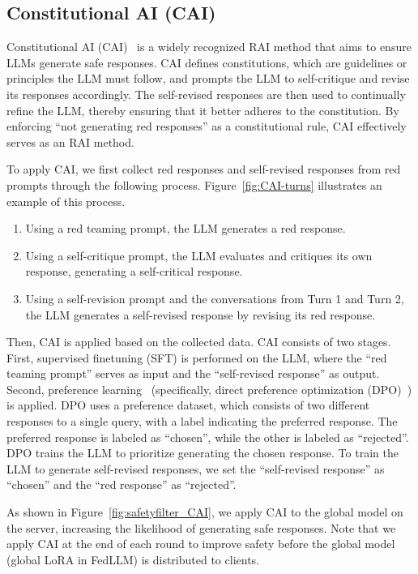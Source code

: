 \subsection{Constitutional AI (CAI)}\label{subsec:CAI}
Constitutional AI (CAI)~\cite{CAI} is a widely recognized RAI method that aims to ensure LLMs generate safe responses.
CAI defines constitutions, which are guidelines or principles the LLM must follow, and prompts the LLM to self-critique and revise its responses accordingly.
The self-revised responses are then used to continually refine the LLM, thereby ensuring that it better adheres to the constitution.
By enforcing ``not generating red responses'' as a constitutional rule, CAI effectively serves as an RAI method.

To apply CAI, we first collect red responses and self-revised responses from red prompts through the following process.
Figure~\ref{fig:CAI-turns} illustrates an example of this process.
\begin{enumerate}[label=(Turn~\arabic*), leftmargin=*]
    \item Using a red teaming prompt, the LLM generates a red response. 
    
    \item Using a self-critique prompt, the LLM evaluates and critiques its own response, generating a self-critical response.

    \item Using a self-revision prompt and the conversations from Turn 1 and Turn 2, the LLM generates a self-revised response by revising its red response.
\end{enumerate}

Then, CAI is applied based on the collected data.
CAI consists of two stages.
First, supervised finetuning (SFT) is performed on the LLM, where the ``red teaming prompt'' serves as input and the ``self-revised response'' as output.
Second, preference learning~\cite{PPO,DPO} (specifically, direct preference optimization (DPO)~\cite{DPO}) is applied.
DPO uses a preference dataset, which consists of two different responses to a single query, with a label indicating the preferred response.
The preferred response is labeled as ``chosen'', while the other is labeled as ``rejected''.  
DPO trains the LLM to prioritize generating the chosen response.  
To train the LLM to generate self-revised responses, we set the ``self-revised response'' as ``chosen'' and the ``red response'' as ``rejected''. 

As shown in Figure~\ref{fig:safetyfilter_CAI}, we apply CAI to the global model on the server, increasing the likelihood of generating safe responses. 
Note that we apply CAI at the end of each round to improve safety before the global model (global LoRA in FedLLM) is distributed to clients.

